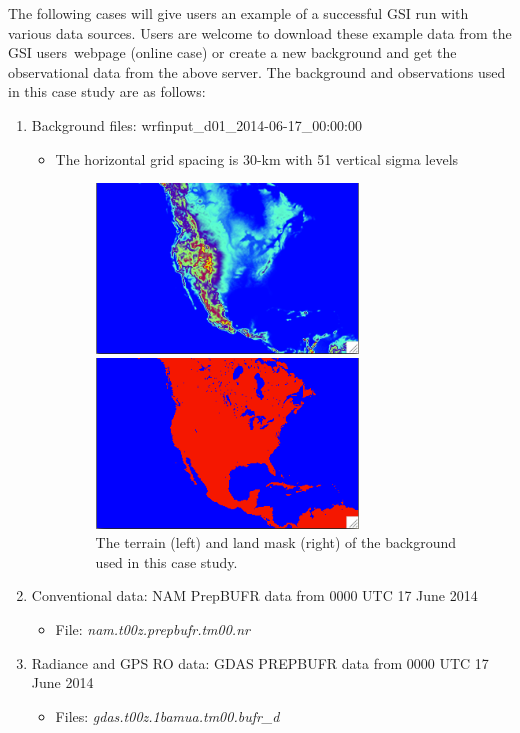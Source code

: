 The following cases will give users an example of a successful GSI run with various data sources.  Users are welcome to download these example data from the GSI users\textquotesingle \ webpage (online case) or create a new background and get the observational data from the above server.  The background and observations used in this case study are as follows:

\begin{enumerate}
\item Background files: wrfinput\_d01\_2014-06-17\_00:00:00
\begin{itemize}
\item The horizontal grid spacing is 30-km with 51 vertical sigma levels
\begin{figure}[h!]
  \begin{minipage}[t]{0.5\linewidth}
  \centering
  \includegraphics[width=0.7\textwidth]{images/terrain}
  \end{minipage} %
  \begin{minipage}[t]{0.5\linewidth}
  \centering
  \includegraphics[width=0.7\textwidth]{images/landmask}
  \end{minipage}
  \caption{The terrain (left) and land mask (right) of the background used in this case study.}
  \label{fig:terland}
\end{figure}
\end{itemize}
\item Conventional data: NAM PrepBUFR data from 0000 UTC 17 June 2014
\begin{itemize}
\item File: \textit{nam.t00z.prepbufr.tm00.nr}
\end{itemize}
\item Radiance and GPS RO data: GDAS PREPBUFR data from 0000 UTC 17 June 2014
\begin{itemize}
\item Files: \textit{gdas.t00z.1bamua.tm00.bufr\_d}


\end{itemize}
\end{enumerate}
